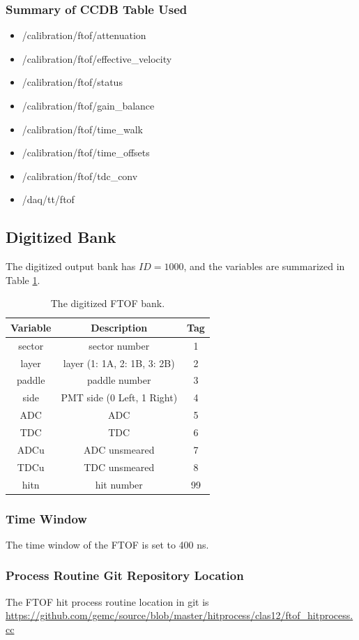 \subsubsection{Summary of CCDB Table Used}
\begin{itemize}
	\item /calibration/ftof/attenuation
	\item /calibration/ftof/effective\_velocity
	\item /calibration/ftof/status
	\item /calibration/ftof/gain\_balance
	\item /calibration/ftof/time\_walk
	\item /calibration/ftof/time\_offsets
	\item /calibration/ftof/tdc\_conv
	\item /daq/tt/ftof
\end{itemize}

\subsection{Digitized Bank}
The digitized output bank has $ID=1000$, and the variables are summarized in Table \ref{tab:ftofBank}.

\begin{table}[h]
	\begin{center}
		\begin{tabular}{| c | c | c |}
			\hline \hline
			Variable         & Description  & Tag  \\
			\hline
              sector  &                             sector number  &    1 \\
               layer  &               layer (1: 1A, 2: 1B, 3: 2B)  &    2 \\
              paddle  &                             paddle number  &    3 \\
                side  &                PMT side (0 Left, 1 Right)  &    4 \\
                 ADC  &                                       ADC  &    5 \\
                 TDC  &                                       TDC  &    6 \\
                ADCu  &                             ADC unsmeared  &    7 \\
                TDCu  &                             TDC unsmeared  &    8 \\
                hitn  &                                hit number  &   99 \\
			\hline \hline
		\end{tabular}
	\end{center}
	\caption{The digitized FTOF bank.}\label{tab:ftofBank}
\end{table}


\subsubsection{Time Window}
The time window  of the FTOF is set to 400 ns.

\subsubsection{Process Routine Git Repository Location}
The FTOF hit process routine location in git is \url{https://github.com/gemc/source/blob/master/hitprocess/clas12/ftof_hitprocess.cc}


